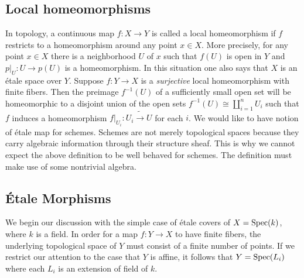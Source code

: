 \subsection{Local homeomorphisms}
In topology, a continuous map $f: X \to Y$ is called a local homeomorphism if $f$ restricts to a homeomorphism around any point $x \in X$. More precisely, for any point $x \in X$ there is a neighborhood $U$ of $x$ such that $f(U)$ is open in $Y$ and $p|_U: U \to p(U)$ is a homeomorphism. In this situation one also says that $X$ is an \'etale space over $Y$. Suppose $f: Y \to X$ is a \textit{surjective} local homeomorphism with finite fibers. Then the preimage $f^{-1}(U)$ of a sufficiently small open set will be homeomorphic to a disjoint union of the open sets $f^{-1}(U) \cong \amalg_{i=1}^n U_i$ such that $f$ induces a homeomorphism $f|_{U_i} : U_i \tilde{\longrightarrow} U$ for each $i$.
%
We would like to have notion of \'etale map for schemes. Schemes are not merely topological spaces because they carry algebraic information through their structure sheaf. This is why we cannot expect the above definition to be well behaved for schemes. The definition must make use of some nontrivial algebra. 

\subsection{\'Etale Morphisms}
We begin our discussion with the simple case of \'etale covers of $X = \operatorname{Spec}(k)$, where $k$ is a field. In order for a map $f: Y \to X$ to have finite fibers, the underlying topological space of $Y$ must consist of a finite number of points. If we restrict our attention to the case that $Y$ is affine, it follows that $Y = \operatorname{Spec}(L_i)$ where each $L_i$ is an extension of field of $k$. 

